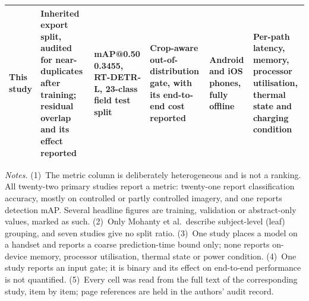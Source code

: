 {\begin{longtable}{L{58pt} L{66pt} L{60pt} L{50pt} L{54pt} L{56pt}}
\midrule
This study & Inherited export split, audited for near-duplicates after training; residual overlap and its effect reported & mAP@0.50 0.3455, RT-DETR-L, 23-class field test split & Crop-aware out-of-distribution gate, with its end-to-end cost reported & Android and iOS phones, fully offline & Per-path latency, memory, processor utilisation, thermal state and charging condition \\
\bottomrule
\end{longtable}\addtocounter{table}{-1}\par}

{\footnotesize
\textit{Notes.} (1)~The metric column is deliberately heterogeneous and is
not a ranking. All twenty-two primary studies report a metric: twenty-one
report classification accuracy, mostly on controlled or partly controlled
imagery, and one reports detection mAP. Several headline figures are
training, validation or abstract-only values, marked as such. (2)~Only
Mohanty et al.\ describe subject-level (leaf) grouping, and seven studies give
no split ratio. (3)~One study places a model on a handset and reports a
coarse prediction-time bound only; none reports on-device memory, processor
utilisation, thermal state or power condition. (4)~One study reports an input
gate; it is binary and its effect on end-to-end performance is not
quantified. (5)~Every cell was read from the full text of the corresponding
study, item by item; page references are held in the authors' audit record.
\par}
\tabletail

